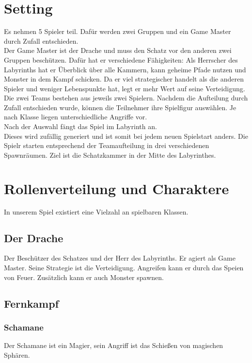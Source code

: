 \documentclass[10pt,a4paper,notitlepage]{scrreprt}
\begin{document}
\begin{flushleft}
\section{Setting}
Es nehmen 5 Spieler teil. Dafür werden zwei Gruppen und ein Game Master durch Zufall entschieden.\\
Der Game Master ist der Drache und muss den Schatz vor den anderen zwei Gruppen beschützen. Dafür hat er verschiedene Fähigkeiten: Als Herrscher des Labyrinths hat er Überblick über alle Kammern, kann geheime Pfade nutzen und Monster in dem Kampf schicken. Da er viel strategischer handelt als die anderen Spieler und weniger Lebenspunkte hat, legt er mehr Wert auf seine Verteidigung.\\
Die zwei Teams bestehen aus jeweils zwei Spielern. Nachdem die Aufteilung durch Zufall entschieden wurde, können die Teilnehmer ihre Spielfigur auswählen. Je nach Klasse liegen unterschiedliche Angriffe vor.\\
Nach der Auswahl fängt das Spiel im Labyrinth an. \\
Dieses wird zufällig generiert und ist somit bei jedem neuen Spielstart anders. Die Spielr starten entsprechend der Teamaufteilung in drei verschiedenen Spawnräumen. Ziel ist die Schatzkammer in der Mitte des Labyrinthes.\\

\section{Rollenverteilung und Charaktere}
In unserem Spiel existiert eine Vielzahl an spielbaren Klassen.\\

\subsection{Der Drache} 
Der Beschützer des Schatzes und der Herr des Labyrinths. Er agiert als Game Master. Seine Strategie ist die Verteidigung. Angreifen kann er durch das Speien von Feuer. Zusätzlich kann er auch Monster spawnen.\\

\subsection{Fernkampf}

\subsubsection{Schamane}
Der Schamane ist ein Magier, sein Angriff ist das Schießen von magischen Sphären.\\


\end{flushleft}
\end{document}
